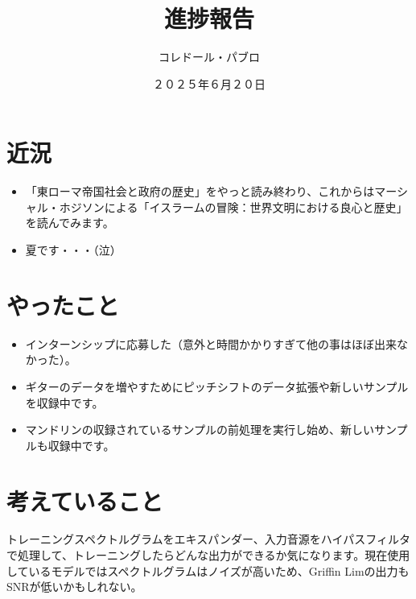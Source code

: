 \documentclass[a4paper, 12pt]{article}
\title{進捗報告}
\author{コレドール・パブロ}
\date{２０２５年６月２０日}
\begin{document}
\maketitle

\section*{近況}
\begin{itemize}
    \item 「東ローマ帝国社会と政府の歴史」をやっと読み終わり、これからはマーシャル・ホジソンによる「イスラームの冒険：世界文明における良心と歴史」を読んでみます。
    \item 夏です・・・（泣）
\end{itemize} 

\section*{やったこと}
\begin{itemize}
    \item インターンシップに応募した（意外と時間かかりすぎて他の事はほぼ出来なかった）。
    \item ギターのデータを増やすためにピッチシフトのデータ拡張や新しいサンプルを収録中です。
    \item マンドリンの収録されているサンプルの前処理を実行し始め、新しいサンプルも収録中です。
\end{itemize}

\section*{考えていること}

トレーニングスペクトルグラムをエキスパンダー、入力音源をハイパスフィルタで処理して、トレーニングしたらどんな出力ができるか気になります。現在使用しているモデルではスペクトルグラムはノイズが高いため、Griffin Limの出力もSNRが低いかもしれない。

\end{document}
